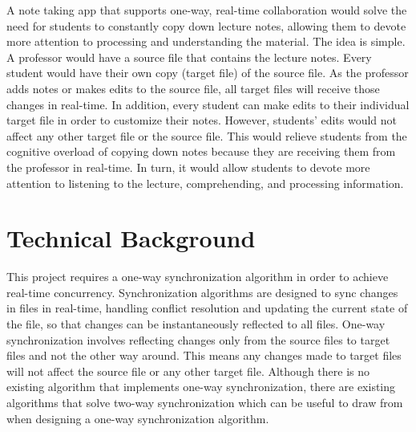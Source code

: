 \documentclass[10pt,twocolumn]{article}
\begin{document}
A note taking app that supports one-way, real-time collaboration would solve the need for students to constantly copy down lecture notes, allowing them to devote more attention to processing and understanding the material. The idea is simple. A professor would have a source file that contains the lecture notes. Every student would have their own copy (target file) of the source file. As the professor adds notes or makes edits to the source file, all target files will receive those changes in real-time. In addition, every student can make edits to their individual target file in order to customize their notes. However, students’ edits would not affect any other target file or the source file. This would relieve students from the cognitive overload of copying down notes because they are receiving them from the professor in real-time. In turn, it would allow students to devote more attention to listening to the lecture, comprehending, and processing information.

\section{Technical Background}
This project requires a one-way synchronization algorithm in order to achieve real-time concurrency. Synchronization algorithms are designed to sync changes in files in real-time, handling conflict resolution and updating the current state of the file, so that changes can be instantaneously reflected to all files. One-way synchronization involves reflecting changes only from the source files to target files and not the other way around. This means any changes made to target files will not affect the source file or any other target file. Although there is no existing algorithm that implements one-way synchronization, there are existing algorithms that solve two-way synchronization which can be useful to draw from when designing a one-way synchronization algorithm. 
\end{document}
